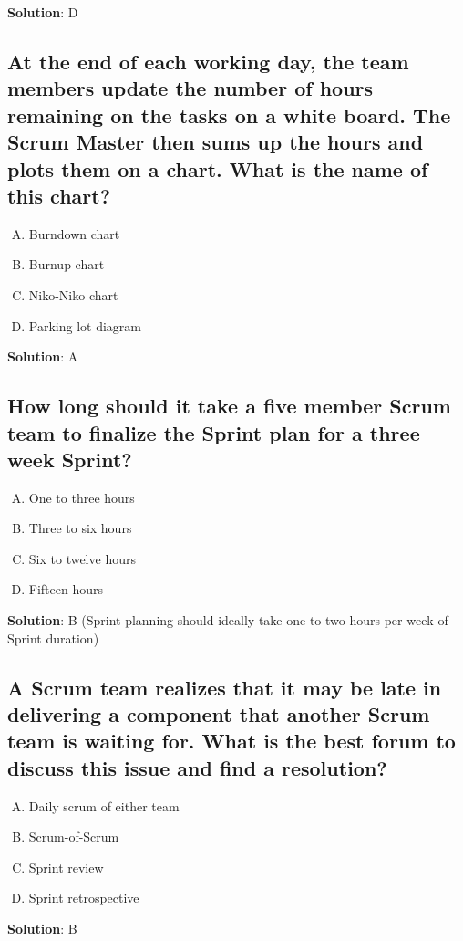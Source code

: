 \textbf{Solution}: D


\subsection{At the end of each working day, the team members update the number of hours remaining on the tasks on a white board. The Scrum Master then sums up the hours and plots them on a chart.  What is the name of this chart?}
\begin{enumerate}[A)]
  \item Burndown chart
  \item Burnup chart
  \item Niko-Niko chart
  \item Parking lot diagram
\end{enumerate}

\textbf{Solution}: A


\subsection{How long should it take a five member Scrum team to finalize the Sprint plan for a three week Sprint?}
\begin{enumerate}[A)]
  \item One to three hours
  \item Three to six hours
  \item Six to twelve hours
  \item Fifteen hours
\end{enumerate}


\textbf{Solution}: B (Sprint planning should ideally take one to two hours per week of Sprint duration)


\subsection{A Scrum team realizes that it may be late in delivering a component that another Scrum team is waiting for.  What is the best forum to discuss this issue and find a resolution?}
\begin{enumerate}[A)]
  \item Daily scrum of either team
  \item Scrum-of-Scrum
  \item Sprint review
  \item Sprint retrospective
\end{enumerate}

\textbf{Solution}: B


